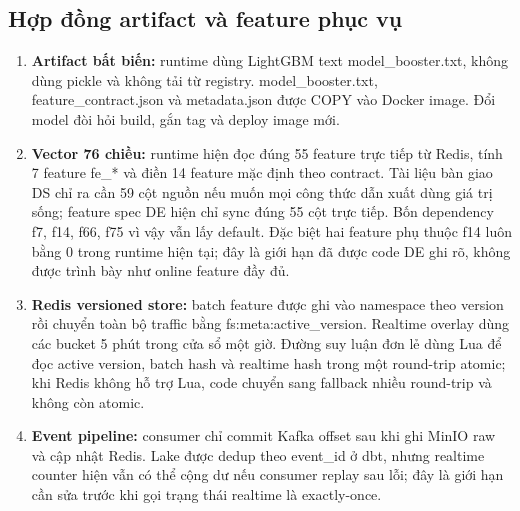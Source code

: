 \documentclass[11pt,a4paper]{article}
\DeclareRobustCommand{\code}[1]{{\small\texttt{#1}}}
\def\code#1{#1}%
\begin{document}
\subsection{Hợp đồng artifact và feature phục vụ}
\begin{enumerate}
    \item \textbf{Artifact bất biến:} runtime dùng LightGBM text
    \code{model\_booster.txt}, không dùng pickle và không tải từ registry.
    \code{model\_booster.txt}, \code{feature\_contract.json} và
    \code{metadata.json} được \code{COPY} vào Docker image. Đổi model đòi hỏi
    build, gắn tag và deploy image mới.
    \item \textbf{Vector 76 chiều:} runtime hiện đọc đúng 55 feature trực tiếp
    từ Redis, tính 7 feature \code{fe\_*} và điền 14 feature mặc định theo
    contract. Tài liệu bàn giao DS chỉ ra cần 59 cột nguồn nếu muốn mọi công
    thức dẫn xuất dùng giá trị sống; feature spec DE hiện chỉ sync đúng 55 cột
    trực tiếp. Bốn dependency \code{f7}, \code{f14}, \code{f66}, \code{f75}
    vì vậy vẫn lấy default. Đặc biệt hai feature phụ thuộc \code{f14} luôn
    bằng 0 trong runtime hiện tại; đây là giới hạn đã được code DE ghi rõ,
    không được trình bày như online feature đầy đủ.
    \item \textbf{Redis versioned store:} batch feature được ghi vào namespace
    theo version rồi chuyển toàn bộ traffic bằng
    \code{fs:meta:active\_version}. Realtime overlay dùng các bucket 5 phút
    trong cửa sổ một giờ. Đường suy luận đơn lẻ dùng Lua để đọc active version,
    batch hash và realtime hash trong một round-trip atomic; khi Redis không
    hỗ trợ Lua, code chuyển sang fallback nhiều round-trip và không còn atomic.
    \item \textbf{Event pipeline:} consumer chỉ commit Kafka offset sau khi
    ghi MinIO raw và cập nhật Redis. Lake được dedup theo \code{event\_id} ở
    dbt, nhưng realtime counter hiện vẫn có thể cộng dư nếu consumer replay
    sau lỗi; đây là giới hạn cần sửa trước khi gọi trạng thái realtime là
    exactly-once.
\end{enumerate}
\end{document}
